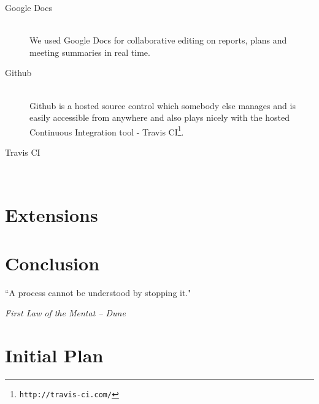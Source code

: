 \documentclass[11pt, a4paper]{article}
\newlength\longest
\begin{document}
\begin{description}
\item[Google Docs] \hfill \\
We used Google Docs for collaborative editing on reports, plans and meeting summaries in real time.
  
\item[Github] \hfill \\
Github is a hosted source control which somebody else manages and is easily accessible from anywhere and also plays nicely with the hosted Continuous Integration tool - Travis CI\footnote{\tt{http://travis-ci.com/}}.

\item[Travis CI] \hfill \\
\end{description}

\section{Extensions}
\section{Conclusion}

\clearpage
\thispagestyle{empty}
\null\vfill
\begin{center}
\settowidth{}
\parbox{\longest}{%
  \raggedright{%
  ``A process cannot be understood by stopping it." \\
  }   
  \raggedright{\emph{First Law of the Mentat -- Dune}}\par%
}
\end{center}
\vfill\vfill
\clearpage

\appendix
\section{Initial Plan}
\label{sec:initialplan}

\end{document}
